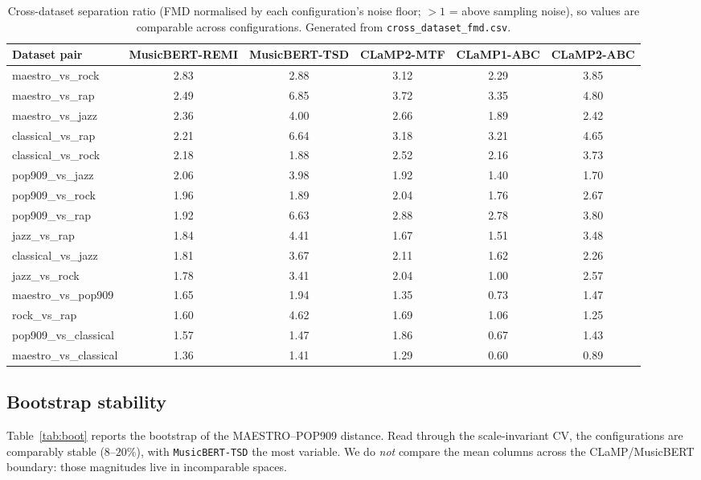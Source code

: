 \documentclass[11pt]{article}
\begin{document}
\begin{table}[t]
\centering
\caption{Cross-dataset separation ratio (FMD normalised by each
configuration's noise floor; $>1$ = above sampling noise), so values are
comparable across configurations. Generated from \texttt{cross\_dataset\_fmd.csv}.}
\label{tab:cross}
\small
\begin{tabular}{@{}lccccc@{}}
\toprule
Dataset pair & MusicBERT-REMI & MusicBERT-TSD & CLaMP2-MTF & CLaMP1-ABC & CLaMP2-ABC \\
\midrule
maestro\_vs\_rock & 2.83 & 2.88 & 3.12 & 2.29 & 3.85 \\
maestro\_vs\_rap & 2.49 & 6.85 & 3.72 & 3.35 & 4.80 \\
maestro\_vs\_jazz & 2.36 & 4.00 & 2.66 & 1.89 & 2.42 \\
classical\_vs\_rap & 2.21 & 6.64 & 3.18 & 3.21 & 4.65 \\
classical\_vs\_rock & 2.18 & 1.88 & 2.52 & 2.16 & 3.73 \\
pop909\_vs\_jazz & 2.06 & 3.98 & 1.92 & 1.40 & 1.70 \\
pop909\_vs\_rock & 1.96 & 1.89 & 2.04 & 1.76 & 2.67 \\
pop909\_vs\_rap & 1.92 & 6.63 & 2.88 & 2.78 & 3.80 \\
jazz\_vs\_rap & 1.84 & 4.41 & 1.67 & 1.51 & 3.48 \\
classical\_vs\_jazz & 1.81 & 3.67 & 2.11 & 1.62 & 2.26 \\
jazz\_vs\_rock & 1.78 & 3.41 & 2.04 & 1.00 & 2.57 \\
maestro\_vs\_pop909 & 1.65 & 1.94 & 1.35 & 0.73 & 1.47 \\
rock\_vs\_rap & 1.60 & 4.62 & 1.69 & 1.06 & 1.25 \\
pop909\_vs\_classical & 1.57 & 1.47 & 1.86 & 0.67 & 1.43 \\
maestro\_vs\_classical & 1.36 & 1.41 & 1.29 & 0.60 & 0.89 \\
\bottomrule
\end{tabular}
\end{table}

\subsection{Bootstrap stability}
Table~\ref{tab:boot} reports the bootstrap of the MAESTRO--POP909 distance.
Read through the scale-invariant CV, the configurations are comparably
stable ($8$--$20\%$), with \texttt{MusicBERT-TSD} the most variable. We do
\emph{not} compare the mean columns across the CLaMP/MusicBERT boundary:
those magnitudes live in incomparable spaces.
\end{document}
